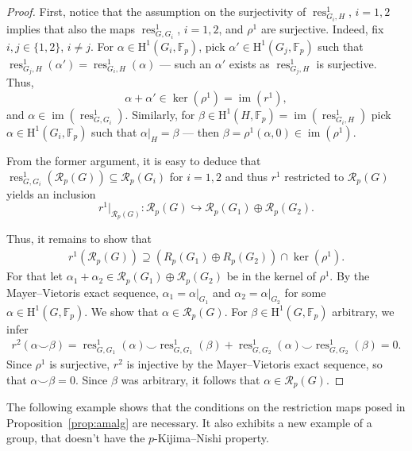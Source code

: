 \documentclass{amsart}
\theoremstyle{definition}
\theoremstyle{remark}
\DeclareMathOperator{\im}{im}
\DeclareMathOperator{\res}{res}
\newcommand{\FF}{\mathbb{F}}
\newcommand{\calR}{\mathcal{R}}
\newcommand{\rmH}{\mathrm H}%
\begin{document}
\begin{proof}
    First, notice that the assumption on the surjectivity of $\res_{G_i,H}^1$, $i=1,2$ implies that also the maps $\res_{G,G_i}^1$, $i=1,2$, and $\rho^1$ are surjective. Indeed, fix $i,j\in\{1,2\}$, $i\neq j$. For $\alpha\in \rmH^1(G_i,\FF_p)$, pick $\alpha'\in \rmH^1(G_j,\FF_p)$ such that $\res_{G_j,H}^1(\alpha')=\res^1_{G_i,H}(\alpha)$ --- such an $\alpha'$ exists as $\res_{G_j,H}^1$ is surjective. Thus, $$\alpha+\alpha'\in\ker(\rho^1)=\im(r^1),$$ and $\alpha\in\im(\res_{G,G_i}^1)$. Similarly, for $\beta\in\rmH^1(H,\FF_p)=\im(\res_{G_i,H}^1)$ pick $\alpha\in\rmH^1(G_i,\FF_p)$ such that $\alpha\vert_H=\beta$ --- then $\beta=\rho^1(\alpha,0)\in\im(\rho^1)$.
    
    From the former argument, it is easy to deduce that $\res^1_{G,G_i}(\calR_p(G))\subseteq \calR_p(G_i)$ for $i=1,2$ and thus $r^1$ restricted to $\calR_p(G)$ yields an inclusion 
    $$r^1\vert_{\calR_p(G)}\colon\calR_p(G)\hookrightarrow \calR_p(G_1)\oplus \calR_p(G_2).$$ 
    
    Thus, it remains to show that
    \begin{align*}
        r^1(\calR_p(G))\supseteq (R_p(G_1)\oplus R_p(G_2))\cap \ker(\rho^1).
    \end{align*}
    For that let $\alpha_1+\alpha_2\in \calR_p(G_1)\oplus  \calR_p(G_2)$ be in the kernel of $\rho^1$.
    By the Mayer--Vietoris exact sequence, $\alpha_1=\alpha\vert_{G_1}$ and $\alpha_2=\alpha\vert_{G_2}$ for some $\alpha\in \rmH^1(G,\FF_p)$. We show that $\alpha\in \calR_p(G)$. For $\beta\in \rmH^1(G,\FF_p)$ arbitrary, we infer
    \begin{align*}
        r^2(\alpha\smallsmile \beta)=\res_{G,G_1}^1(\alpha)\smallsmile \res_{G,G_1}^1(\beta)+\res_{G,G_2}^1(\alpha)\smallsmile \res_{G,G_2}^1(\beta)=0.
    \end{align*}
Since $\rho^1$ is surjective, $r^2$ is injective by the Mayer--Vietoris exact sequence, so that $\alpha\smallsmile \beta=0$. Since $\beta$ was arbitrary, it follows that $\alpha\in \calR_p(G)$.
\end{proof}
The following example shows that the conditions on the restriction maps posed in Proposition~\ref{prop:amalg} are necessary. It also exhibits a new example of a group, that doesn't have the $p$-Kijima--Nishi property. 
\end{document}
